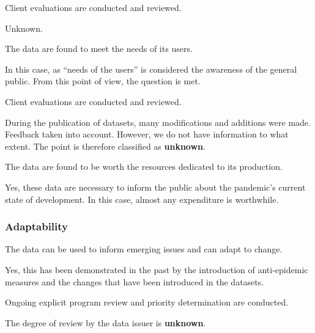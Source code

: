 \begin{QandA}
    \item Client evaluations are conducted and reviewed.
    \begin{answered}
        Unknown.
    \end{answered}

    \item The data are found to meet the needs of its users.
    \begin{answered}
        In this case, as \enquote{needs of the users} is considered the awareness of the general public.
        From this point of view, the question is met.
    \end{answered}

    \item Client evaluations are conducted and reviewed.
    \begin{answered}
        During the publication of datasets, many modifications and additions were made.
        Feedback taken into account.
        However, we do not have information to what extent.
        The point is therefore classified as \textbf{unknown}.
    \end{answered}

    \item The data are found to be worth the resources dedicated to its production.
    \begin{answered}
        Yes, these data are necessary to inform the public about the pandemic's current state of development.
        In this case, almost any expenditure is worthwhile.
    \end{answered}

\end{QandA}

\subsubsection{Adaptability}

\begin{QandA}
    \item The data can be used to inform emerging issues and can adapt to change.
    \begin{answered}
        Yes, this has been demonstrated in the past by the introduction of anti-epidemic measures and the changes that have been introduced in the datasets.
    \end{answered}

    \item Ongoing explicit program review and priority determination are conducted.
    \begin{answered}
        The degree of review by the data issuer is \textbf{unknown}.
    \end{answered}

\end{QandA}

